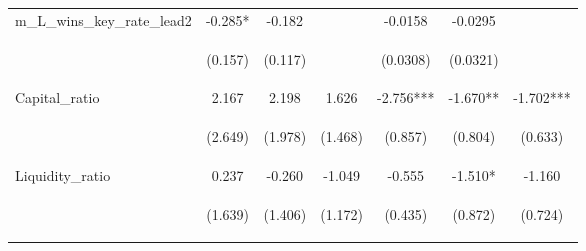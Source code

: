 \documentclass[]{article}
\begin{document}
\begin{center}
\begin{tabular}{lcccccc}
m\_L\_wins\_key\_rate\_lead2 & -0.285* & -0.182 &  & -0.0158 & -0.0295 &  \\
\vspace{4pt} & \begin{footnotesize}(0.157)\end{footnotesize} & \begin{footnotesize}(0.117)\end{footnotesize} & \begin{footnotesize}\end{footnotesize} & \begin{footnotesize}(0.0308)\end{footnotesize} & \begin{footnotesize}(0.0321)\end{footnotesize} & \begin{footnotesize}\end{footnotesize} \\
Capital\_ratio & 2.167 & 2.198 & 1.626 & -2.756*** & -1.670** & -1.702*** \\
\vspace{4pt} & \begin{footnotesize}(2.649)\end{footnotesize} & \begin{footnotesize}(1.978)\end{footnotesize} & \begin{footnotesize}(1.468)\end{footnotesize} & \begin{footnotesize}(0.857)\end{footnotesize} & \begin{footnotesize}(0.804)\end{footnotesize} & \begin{footnotesize}(0.633)\end{footnotesize} \\
Liquidity\_ratio & 0.237 & -0.260 & -1.049 & -0.555 & -1.510* & -1.160 \\
\vspace{4pt} & \begin{footnotesize}(1.639)\end{footnotesize} & \begin{footnotesize}(1.406)\end{footnotesize} & \begin{footnotesize}(1.172)\end{footnotesize} & \begin{footnotesize}(0.435)\end{footnotesize} & \begin{footnotesize}(0.872)\end{footnotesize} & \begin{footnotesize}(0.724)\end{footnotesize} \\

\end{tabular}
\end{center}
\end{document}
